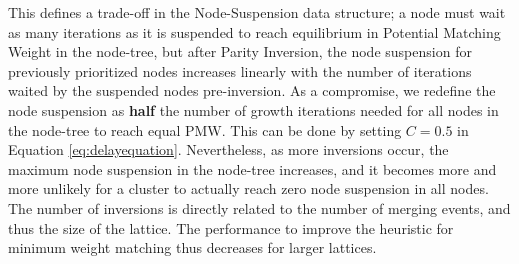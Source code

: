 This defines a trade-off in the Node-Suspension data structure; a node must wait as many iterations as it is suspended to reach equilibrium in Potential Matching Weight in the node-tree, but after Parity Inversion, the node suspension for previously prioritized nodes increases linearly with the number of iterations waited by the suspended nodes pre-inversion. As a compromise, we redefine the node suspension as \textbf{half} the number of growth iterations needed for all nodes in the node-tree to reach equal PMW. This can be done by setting $C=0.5$ in Equation \eqref{eq:delayequation}. Nevertheless, as more inversions occur, the maximum node suspension in the node-tree increases, and it becomes more and more unlikely for a cluster to actually reach zero node suspension in all nodes. The number of inversions is directly related to the number of merging events, and thus the size of the lattice. The performance to improve the heuristic for minimum weight matching thus decreases for larger lattices. 

